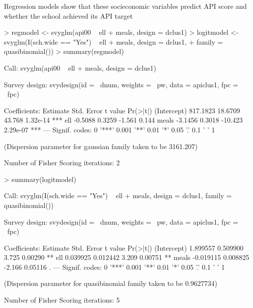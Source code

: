 \documentclass{article}
\begin{document}
Regression models show that these socieconomic variables predict API score and whether the school achieved its API target
\begin{Schunk}
\begin{Sinput}
> regmodel <- svyglm(api00 ~ ell + meals, design = dclus1)
> logitmodel <- svyglm(I(sch.wide == "Yes") ~ ell + meals, design = dclus1, 
+     family = quasibinomial())
> summary(regmodel)
\end{Sinput}
\begin{Soutput}
Call:
svyglm(api00 ~ ell + meals, design = dclus1)

Survey design:
svydesign(id = ~dnum, weights = ~pw, data = apiclus1, fpc = ~fpc)

Coefficients:
            Estimate Std. Error t value Pr(>|t|)    
(Intercept) 817.1823    18.6709  43.768 1.32e-14 ***
ell          -0.5088     0.3259  -1.561    0.144    
meals        -3.1456     0.3018 -10.423 2.29e-07 ***
---
Signif. codes:  0 '***' 0.001 '**' 0.01 '*' 0.05 '.' 0.1 ' ' 1 

(Dispersion parameter for gaussian family taken to be 3161.207)

Number of Fisher Scoring iterations: 2
\end{Soutput}
\begin{Sinput}
> summary(logitmodel)
\end{Sinput}
\begin{Soutput}
Call:
svyglm(I(sch.wide == "Yes") ~ ell + meals, design = dclus1, family = quasibinomial())

Survey design:
svydesign(id = ~dnum, weights = ~pw, data = apiclus1, fpc = ~fpc)

Coefficients:
             Estimate Std. Error t value Pr(>|t|)   
(Intercept)  1.899557   0.509900   3.725  0.00290 **
ell          0.039925   0.012442   3.209  0.00751 **
meals       -0.019115   0.008825  -2.166  0.05116 . 
---
Signif. codes:  0 '***' 0.001 '**' 0.01 '*' 0.05 '.' 0.1 ' ' 1 

(Dispersion parameter for quasibinomial family taken to be 0.9627734)

Number of Fisher Scoring iterations: 5
\end{Soutput}
\end{Schunk}
\end{document}
